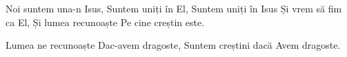 \beginverse
Noi suntem una-n Isus,
Suntem uniți în El,
Suntem uniți în Isus
Și vrem să fim ca El,
Și lumea recunoaște
Pe cine creștin este.
\endverse

\beginchorus
Lumea ne recunoaște
Dac-avem dragoste,
Suntem creștini dacă
Avem dragoste.
\endchorus
\endsong